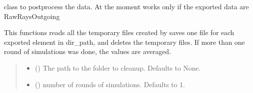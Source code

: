 \documentclass[letterpaper,10pt,english]{sphinxmanual}
\begin{document}
\begin{fulllineitems}
\label{\detokenize{code_documentation:raypyng.postprocessing.PostProcess}}
\pysigstartsignatures
{}
\pysigstopsignatures
\sphinxAtStartPar
class to post\sphinxhyphen{}process the data.
At the moment works only if the exported data are RawRaysOutgoing

\begin{fulllineitems}
\label{\detokenize{code_documentation:raypyng.postprocessing.PostProcess.cleanup}}
\pysigstartsignatures
{}
\pysigstopsignatures
\sphinxAtStartPar
This functions reads all the temporary files created by 
saves one file for each exported element in dir\_path, and deletes the temporary files.
If more than one round of simulations was done, the values are averaged.
\begin{quote}\begin{description}
\begin{itemize}
\item {} 
\sphinxAtStartPar
{} (\sphinxstyleliteralemphasis{\sphinxupquote{, }}) \textendash{} The path to the folder to cleanup. Defaults to None.

\item {} 
\sphinxAtStartPar
{} (\sphinxstyleliteralemphasis{\sphinxupquote{, }}) \textendash{} number of rounds of simulations. Defaults to 1.


\end{itemize}
\end{description}
\end{quote}
\end{fulllineitems}
\end{fulllineitems}
\end{document}
